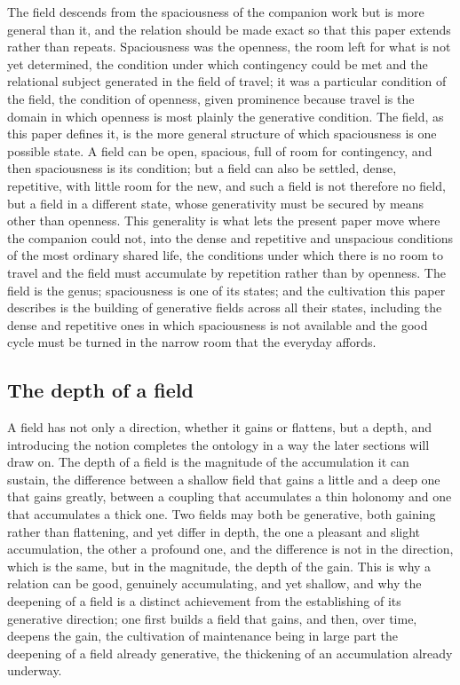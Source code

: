 The field descends from the spaciousness of the companion work but is more general than it, and the relation should be made exact so that this paper extends rather than repeats. Spaciousness was the openness, the room left for what is not yet determined, the condition under which contingency could be met and the relational subject generated in the field of travel; it was a particular condition of the field, the condition of openness, given prominence because travel is the domain in which openness is most plainly the generative condition. The field, as this paper defines it, is the more general structure of which spaciousness is one possible state. A field can be open, spacious, full of room for contingency, and then spaciousness is its condition; but a field can also be settled, dense, repetitive, with little room for the new, and such a field is not therefore no field, but a field in a different state, whose generativity must be secured by means other than openness. This generality is what lets the present paper move where the companion could not, into the dense and repetitive and unspacious conditions of the most ordinary shared life, the conditions under which there is no room to travel and the field must accumulate by repetition rather than by openness. The field is the genus; spaciousness is one of its states; and the cultivation this paper describes is the building of generative fields across all their states, including the dense and repetitive ones in which spaciousness is not available and the good cycle must be turned in the narrow room that the everyday affords.

\subsection{The depth of a field}
\label{p22:sub:field-depth}

A field has not only a direction, whether it gains or flattens, but a depth, and introducing the notion completes the ontology in a way the later sections will draw on. The depth of a field is the magnitude of the accumulation it can sustain, the difference between a shallow field that gains a little and a deep one that gains greatly, between a coupling that accumulates a thin holonomy and one that accumulates a thick one. Two fields may both be generative, both gaining rather than flattening, and yet differ in depth, the one a pleasant and slight accumulation, the other a profound one, and the difference is not in the direction, which is the same, but in the magnitude, the depth of the gain. This is why a relation can be good, genuinely accumulating, and yet shallow, and why the deepening of a field is a distinct achievement from the establishing of its generative direction; one first builds a field that gains, and then, over time, deepens the gain, the cultivation of maintenance being in large part the deepening of a field already generative, the thickening of an accumulation already underway.

